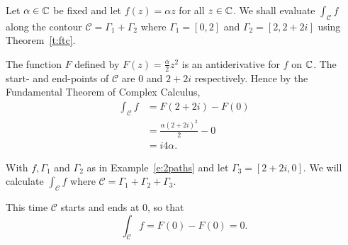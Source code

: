 \begin{example}
\label{e:2paths}
Let $\alpha \in \mathbb{C}$ be fixed and let $f(z)=\alpha z$ for all $z \in \mathbb{C}$.  We shall evaluate $\int_{\mathcal{C}} f$ along the contour $\mathcal{C}=\Gamma_1 + \Gamma_2$ where $\Gamma_1=[0,2]$ and $\Gamma_2 = [2,2+2i]$ using Theorem~\ref{t:ftc}.
\end{example}
\begin{solution}
The function $F$ defined by $F(z)=\frac{\alpha}{2} z^2$ is an antiderivative for $f$ on $\mathbb{C}$.
  The start- and end-points of $\mathcal{C}$ are $0$ and $2+2i$ respectively.  Hence by the Fundamental Theorem of Complex Calculus,
\begin{align*}
\int_{\mathcal{C}} f &= F(2+2i)-F(0) \\
& = \frac{\alpha (2+2i)^2}{2} - 0 \\
& = i 4 \alpha.
\end{align*}
\end{solution}

\begin{example}
With $f,\Gamma_1$ and $\Gamma_2$ as in Example~\ref{e:2paths} and let $\Gamma_3 = [2+2i,0]$.  We will calculate $\int_{\mathcal{C}} f$ where $\mathcal{C}=\Gamma_1+\Gamma_2+\Gamma_3$.
\end{example}
\begin{solution}
This time $\mathcal{C}$ starts and ends at $0$, so that
\[
\int_{\mathcal{C}} f = F(0) - F(0) = 0.
\]
\end{solution}

